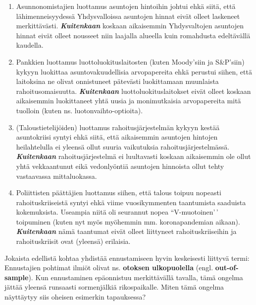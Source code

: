 \documentclass[
]{book}
\providecommand{\tightlist}{%
  \setlength{\itemsep}{0pt}\setlength{\parskip}{0pt}}
\begin{document}
\begin{eblock}{}
\begin{enumerate}
\def\labelenumi{\arabic{enumi}.}
\tightlist
\item
  Asunnonomistajien luottamus asuntojen hintoihin johtui ehkä siitä, että lähimenneisyydessä Yhdysvalloissa asuntojen hinnat eivät olleet laskeneet merkittävästi. \textbf{\emph{Kuitenkaan}} koskaan aikaisemmin Yhdysvaltojen asuntojen hinnat eivät olleet nousseet niin laajalla alueella kuin romahdusta edeltävällä kaudella.
\item
  Pankkien luottamus luottoluokituslaitosten (kuten Moody'siin ja S\&P'siin) kykyyn luokittaa asuntovakuudellisia arvopapereita ehkä perustui siihen, että laitoksina ne olivat onnistuneet pätevästi luokittamaan muunlaista rahoitusomaisuutta. \textbf{\emph{Kuitenkaan}} luottoluokituslaitokset eivät olleet koskaan aikaisemmin luokittaneet yhtä uusia ja monimutkaisia arvopapereita mitä tuolloin (kuten ns. luotonvaihto-optioita).
\item
  (Taloustietelijöiden) luottamus rahoitusjärjestelmän kykyyn kestää asuntokriisi syntyi ehkä siitä, että aikaisemmin asuntojen hintojen heilahtelulla ei yleensä ollut suuria vaikutuksia rahoitusjärjestelmässä. \textbf{\emph{Kuitenkaan}} rahoitusjärjestelmä ei luultavasti koskaan aikaisemmin ole ollut yhtä vekkaantunut eikä vedonlyöntiä asuntojen hinnoista ollut tehty vastaavassa mittaluokassa.
\item
  Poliittisten päättäjien luottamus siihen, että talous toipuu nopeasti rahoituskriiseistä syntyi ehkä viime vuosikymmenten taantumista saaduista kokemuksista. Useampia niitä oli seurannut nopea ``V-muotoinen'\,' toipuminen (kuten nyt myös myöhemmin mm. koronapandemian aikaan). \textbf{\emph{Kuitenkaan}} nämä taantumat eivät olleet liittyneet rahoituskriiseihin ja rahoituskriisit ovat (yleensä) erilaisia.
\end{enumerate}

Jokaista edellistä kohtaa yhdistää ennustamiseen hyvin keskeisesti liittyvä termi: Ennustajien pohtimat ilmiöt olivat ns. \textbf{otoksen ulkopuolella} (engl. \textbf{out-of-sample}). Kun ennustaminen epäonnistuu merkittävällä tavalla, tämä ongelma jättää yleensä runsaasti sormenjälkiä rikospaikalle. Miten tämä ongelma näyttäytyy siis oheisen esimerkin tapauksessa?


\end{eblock}
\end{document}
